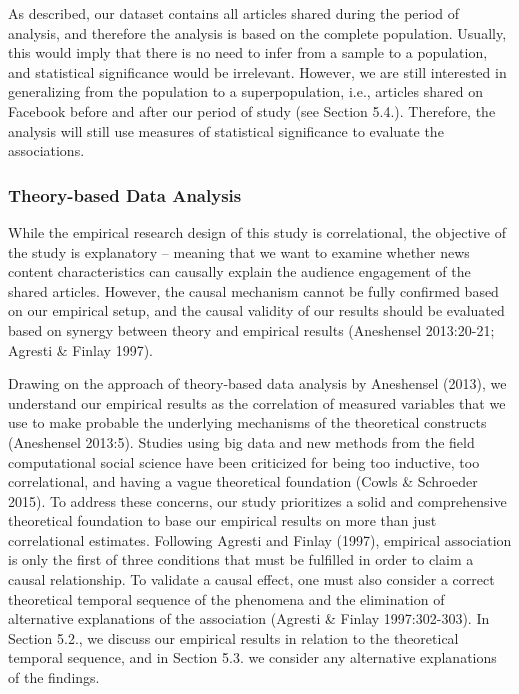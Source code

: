 \documentclass[
]{article}
\begin{document}
As described, our dataset contains all articles shared during the period
of analysis, and therefore the analysis is based on the complete
population. Usually, this would imply that there is no need to infer
from a sample to a population, and statistical significance would be
irrelevant. However, we are still interested in generalizing from the
population to a superpopulation, i.e., articles shared on Facebook
before and after our period of study (see Section 5.4.). Therefore, the
analysis will still use measures of statistical significance to evaluate
the associations.

\hypertarget{theory-based-data-analysis}{%
\subsubsection{Theory-based Data
Analysis}\label{theory-based-data-analysis}}

\noindent While the empirical research design of this study is
correlational, the objective of the study is explanatory -- meaning that
we want to examine whether news content characteristics can causally
explain the audience engagement of the shared articles. However, the
causal mechanism cannot be fully confirmed based on our empirical setup,
and the causal validity of our results should be evaluated based on
synergy between theory and empirical results (Aneshensel 2013:20-21;
Agresti \& Finlay 1997).

Drawing on the approach of theory-based data analysis by Aneshensel
(2013), we understand our empirical results as the correlation of
measured variables that we use to make probable the underlying
mechanisms of the theoretical constructs (Aneshensel 2013:5). Studies
using big data and new methods from the field computational social
science have been criticized for being too inductive, too correlational,
and having a vague theoretical foundation (Cowls \& Schroeder 2015). To
address these concerns, our study prioritizes a solid and comprehensive
theoretical foundation to base our empirical results on more than just
correlational estimates. Following Agresti and Finlay (1997), empirical
association is only the first of three conditions that must be fulfilled
in order to claim a causal relationship. To validate a causal effect,
one must also consider a correct theoretical temporal sequence of the
phenomena and the elimination of alternative explanations of the
association (Agresti \& Finlay 1997:302-303). In Section 5.2., we
discuss our empirical results in relation to the theoretical temporal
sequence, and in Section 5.3. we consider any alternative explanations
of the findings.
\end{document}
